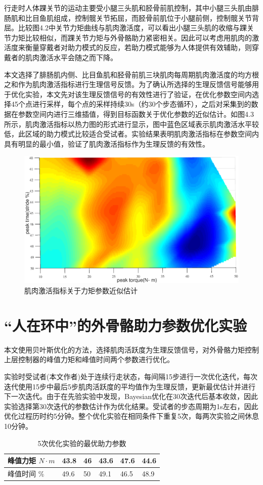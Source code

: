 行走时人体踝关节的运动主要受小腿三头肌和胫骨前肌控制，其中小腿三头肌由腓肠肌和比目鱼肌组成，控制髋关节拓屈，而胫骨前肌位于小腿前侧，控制髋关节背屈。比较图4.2中关节力矩曲线与肌肉激活度，可以看出小腿三头肌的收缩与踝关节力矩比较相似，而踝关节力矩与外骨骼助力紧密相关。因此可以考虑用肌肉的激活度来衡量穿戴者对助力模式的反应，若助力模式能够为人体提供有效辅助，则穿戴者的肌肉激活水平会随之而下降。

本文选择了腓肠肌内侧、比目鱼肌和胫骨前肌三块肌肉每周期肌肉激活度的均方根之和作为肌肉激活指标进行生理信号反馈。为了确认所选择的生理反馈信号能够用于优化实验，本文先对该生理反馈信号的有效性进行了验证，在优化参数空间内选择45个点进行采样，每个点的采样持续30s（约30个步态循环），之后对采集到的数据在参数空间内进行三维插值，得到目标函数关于优化参数的近似估计。如图4.3所示，肌肉激活指标以热力图的形式进行显示，图中蓝色区域表示肌肉激活水平较低，此区域的助力模式比较适合受试者。实验结果表明肌肉激活指标在参数空间内具有明显的最小值，验证了肌肉激活指标作为生理反馈的有效性。
\begin{figure}[!htb]
    \includegraphics[width=17cm]{fig/f63.eps}
    \caption{肌肉激活指标关于力矩参数近似估计}
    \label{fig:mark}
\end{figure}

\section{“人在环中”的外骨骼助力参数优化实验}

本文使用贝叶斯优化的方法，选择肌肉活跃度为生理反馈信号，对外骨骼力矩控制上层控制器的峰值力矩和峰值时间两个参数进行优化。

实验时受试者(本文作者)处于连续行走状态，每间隔15步进行一次优化迭代，每次迭代使用15步中最后5步肌肉活跃度的平均值作为生理反馈，更新最优估计并进行下一次迭代。由于在先验实验中发现，Bayesian优化在30次迭代后基本收敛，因此实验选择第30次迭代的参数估计作为优化结果。受试者的步态周期为1s左右，因此优化过程历时约5分钟。整个优化实验在相同条件下重复5次，每两次实验之间休息10分钟。
\begin{table}[htb]
    \caption[控制参数]{5次优化实验的最优助力参数}
    \begin{tabular}{llllll}
      \toprule
        峰值力矩 $N\cdot m$ & 43.8 & 46 & 43.6 & 47.6 & 44.6 \\
      \midrule
        峰值时间 $\%$ & 49.6 & 50 & 49.1 & 46.5 & 48.9 \\
      \bottomrule
    \end{tabular}
\end{table}

